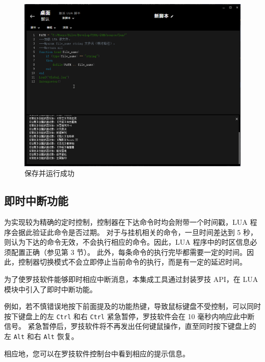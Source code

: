 \begin{figure}[H]
    \Centering
    \includegraphics[width=\textwidth]{docs/assets/success.png}
    \caption{保存并运行成功}
\end{figure}

\subsection{即时中断功能}

为实现较为精确的定时控制，控制器在下达命令时均会附带一个时间戳，LUA 程序会据此验证此命令是否过期。
对于与挂机相关的命令，一旦时间差达到 5 秒，则认为下达的命令无效，不会执行相应的命令。因此，LUA 程序中的时区信息必须配置正确（参见第 3 节）。
此外，每条命令的执行完毕都需要一定的时间。因此，控制器切换模式不会立即停止当前命令的执行，而是有一定的延迟时间。

为了使罗技软件能够即时相应中断消息，本集成工具通过封装罗技 API，在 LUA 模块中引入了即时中断功能。

例如，若不慎错误地按下前面提及的功能热键，导致鼠标键盘不受控制，可以同时按下键盘上的左 \lstinline{Ctrl} 和右 \lstinline{Ctrl} 紧急暂停，罗技软件会在 10 毫秒内响应此中断信号。
紧急暂停后，罗技软件将不再发出任何键鼠操作，直至同时按下键盘上的左 \lstinline{Alt} 和右 \lstinline{Alt} 恢复。

相应地，您可以在罗技软件控制台中看到相应的提示信息。

